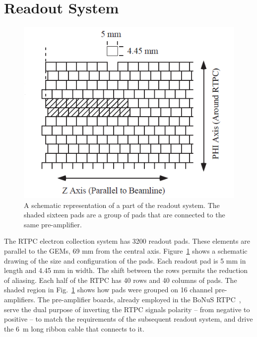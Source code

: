 \documentclass[preprint,5p]{elsarticle}
\begin{document}
\section{Readout System} \label{sec_readout}

\begin{figure}[tb]
   \centering
   \includegraphics[scale=0.55]{fig/PADs.png}
   \caption[]{A schematic representation of a part of the readout system.  The 
   shaded sixteen pads are a group of pads that are connected to the same 
pre-amplifier.} \label{fig:PADs}
\end{figure}

The RTPC electron collection system has 3200 readout pads. These elements are
parallel to the GEMs, 69 mm from the central axis.
Figure~\ref{fig:PADs} shows a schematic drawing of the size and 
configuration of the pads. Each readout pad is 5 mm in length and 4.45 mm in 
width. The shift between the rows permits the reduction of aliasing. Each half of the 
RTPC has 40 rows and 40 columns of pads. The shaded region in Fig.~\ref{fig:PADs} 
shows how pads were grouped on 16 channel pre-amplifiers. The pre-amplifier boards, 
already employed in the BoNuS RTPC~\cite{BONUS-NIM}, serve the dual purpose of 
inverting the RTPC signals polarity -- from negative to positive -- to match the 
requirements of the subsequent readout system, and drive the 6~m long ribbon 
cable that connects to it.
\end{document}

